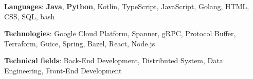 \hspace{-3mm}\textbf{Languages}: \textbf{Java}, \textbf{Python}, Kotlin, TypeScript, JavaScript, Golang, HTML, CSS, SQL, bash

\hspace{-3mm}\textbf{Technologies}: Google Cloud Platform, Spanner, gRPC, Protocol Buffer, Terraform, Guice, Spring, Bazel, React, Node.js

\hspace{-3mm}\textbf{Technical fields}: Back-End Development, Distributed System, Data Engineering, Front-End Development
